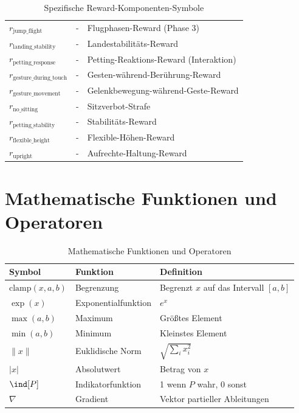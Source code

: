 \begin{table}[htbp]
\begin{tabular}{lll}
		$r_{\text{jump_flight}}$ & - & Flugphasen-Reward (Phase 3) \\
		$r_{\text{landing_stability}}$ & - & Landestabilitäts-Reward \\
		$r_{\text{petting_response}}$ & - & Petting-Reaktions-Reward (Interaktion) \\
		$r_{\text{gesture_during_touch}}$ & - & Gesten-während-Berührung-Reward \\
		$r_{\text{gesture_movement}}$ & - & Gelenkbewegung-während-Geste-Reward \\
		$r_{\text{no_sitting}}$ & - & Sitzverbot-Strafe \\
		$r_{\text{petting\_stability}}$ & - & Stabilitäts-Reward \\
		$r_{\text{flexible_height}}$ & - & Flexible-Höhen-Reward \\
		$r_{\text{upright}}$ & - & Aufrechte-Haltung-Reward \\
		\bottomrule
	\end{tabular}
	\caption{Spezifische Reward-Komponenten-Symbole}
	\label{tab:symbols_rewards}
\end{table}

\section{Mathematische Funktionen und Operatoren}

\begin{table}[htbp]
	\centering
	\begin{tabular}{lll}
		\toprule
		\textbf{Symbol} & \textbf{Funktion} & \textbf{Definition} \\
		\midrule
		$\text{clamp}(x, a, b)$ & Begrenzung & Begrenzt $x$ auf das Intervall $[a, b]$ \\
		$\exp(x)$ & Exponentialfunktion & $e^x$ \\
		$\max(a, b)$ & Maximum & Größtes Element \\
		$\min(a, b)$ & Minimum & Kleinstes Element \\
		$\|x\|$ & Euklidische Norm & $\sqrt{\sum_i x_i^2}$ \\
		$|x|$ & Absolutwert & Betrag von $x$ \\
		$\ind[P]$ & Indikatorfunktion & 1 wenn $P$ wahr, 0 sonst \\
		$\nabla$ & Gradient & Vektor partieller Ableitungen \\
		\bottomrule
	\end{tabular}
	\caption{Mathematische Funktionen und Operatoren}
	\label{tab:symbols_functions}
\end{table}

